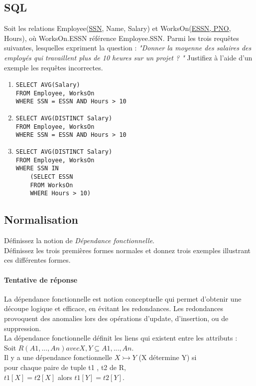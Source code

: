 \subsection{SQL}
Soit les relations Employee(\underline{SSN}, Name, Salary) et WorksOn(\underline{ESSN, PNO}, Hours), 
où WorksOn.ESSN référence Employee.SSN.
Parmi les trois requêtes suivantes, lesquelles expriment la question : 
\textit{"Donner la moyenne des salaires des employés qui travaillent plus de 10 heures sur un projet ? "} Justifiez à l'aide d'un exemple les requêtes incorrectes.\\
\begin{enumerate}
\item 
\begin{lstlisting}
SELECT AVG(Salary) 
FROM Employee, WorksOn
WHERE SSN = ESSN AND Hours > 10 
\end{lstlisting}
\item 
\begin{lstlisting}
SELECT AVG(DISTINCT Salary) 
FROM Employee, WorksOn
WHERE SSN = ESSN AND Hours > 10 
\end{lstlisting}	
\item 
\begin{lstlisting}
SELECT AVG(DISTINCT Salary) 
FROM Employee, WorksOn
WHERE SSN IN 
	(SELECT ESSN 
	FROM WorksOn 
	WHERE Hours > 10) 
\end{lstlisting}
\end{enumerate}



\subsection{Normalisation}
Définissez la notion de \textit{Dépendance fonctionnelle}.\\
Définissez les trois premières formes normales et donnez trois exemples 
illustrant ces différentes formes.

\paragraph{Tentative de réponse}
La dépendance fonctionnelle est notion conceptuelle qui permet d'obtenir 
une découpe logique et efficace, en évitant les redondances. 
Les redondances provoquent des anomalies lors des opérations d'update, 
d'insertion, ou de suppression.\\
La dépendance fonctionnelle définit les liens qui existent entre les attributs :
\\
Soit $R(A1, ..., An) avec X, Y \subseteq {A1 ,..., An }.$ \\
Il y a une dépendance fonctionnelle $X \rightarrowtail Y$ (X détermine Y)
si \\
pour chaque paire de tuple t1 , t2 de R,\\
$t1[X] = t2[X]$ alors $t1[Y] = t2[Y]$.\\


